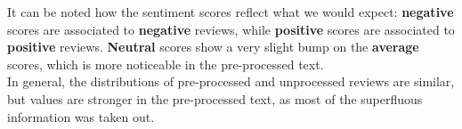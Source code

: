 \documentclass[
12pt,
a4paper,
oneside,
headinclude,
footinclude]{article}
\theoremstyle{definition} %
\begin{document}
It can be noted how the sentiment scores reflect what we would expect: \textbf{negative} scores are associated to \textbf{negative} reviews, while \textbf{positive} scores are associated to \textbf{positive} reviews. \textbf{Neutral} scores show a very slight bump on the \textbf{average} scores, which is more noticeable in the pre-processed text.\\
In general, the distributions of pre-processed and unprocessed reviews are similar, but values are stronger in the pre-processed text, as most of the superfluous information was taken out.



\end{document}
